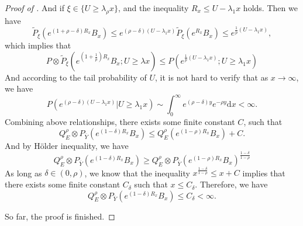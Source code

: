 \documentclass[10pt,a4paper]{amsart}
\renewcommand{\d}{\mathrm{d}}
\begin{document}
\begin{proof}[Proof of ]
	And if $\xi\in \{U\geqslant \lambda_\rho x\}$, and the inequality $R_x\leqslant U-\lambda_1 x$ holds. Then we have
	\begin{equation*}
		\tilde{P}_\xi(e^{(1+\rho-\delta)R_x}B_x)
		\leqslant e^{(\rho-\delta)(U-\lambda_1x)}
		\tilde{P}_\xi(e^{R_x}B_x)\leqslant e^{\frac{1}{p}(U-\lambda_1x)},
	\end{equation*}
	which implies that
	\begin{equation*}
		P\otimes \tilde{P}_\xi (e^{(1+\frac{1}{p})R_x}B_x;U\geqslant\lambda x)\leqslant
		P\left( e^{\frac{1}{p}(U-\lambda_1 x)};U\geqslant \lambda_1 x \right)
	\end{equation*}
	And according to the tail probability of $U$, it is not hard to verify that as $x\rightarrow\infty$, we have
	\begin{equation*}
		P\left( e^{(\rho-\delta)(U-\lambda_1 x)}|U\geqslant \lambda_1 x \right) \sim \int_{0}^{\infty} e^{(\rho-\delta)y} e^{-\rho y} \d x <\infty.
	\end{equation*}
	Combining above relationships, there exists some finite constant $C$, such that
	\begin{equation*}
		Q_E^{\rho}\otimes P_{\overline{Y}} \left(
		e^{(1-\delta)R_x} B_x
		\right)\leqslant Q_E^{\rho} \left(
		e^{(1-\rho)R_x} B_x
		\right) +C.
	\end{equation*}
	And by H\"older inequality, we have
	\begin{equation*}
		Q_E^{\rho}\otimes P_{\overline{Y}} \left(
		e^{(1-\delta)R_x} B_x
		\right)
		\geqslant
		Q_E^{\rho}\otimes P_{\overline{Y}} \left(
		e^{(1-\rho)R_x} B_x
		\right) ^{\frac{1-\delta}{1-\rho}}
	\end{equation*}
    As long as $\delta \in (0,\rho)$, we know that the inequality $x^{\frac{1-\delta}{1-\rho}}\leqslant x+C$ implies that there exists some finite constant $C_\delta$ such that $x\leqslant C_\delta$. Therefore, we have
    \begin{equation*}
    	Q_E^{\rho}\otimes P_{\overline{Y}} \left(
    	e^{(1-\delta)R_x} B_x
    	\right) \leqslant C_\delta<\infty.
    \end{equation*}
    
    So far, the proof is finished.
    \end{proof}
\end{document}
